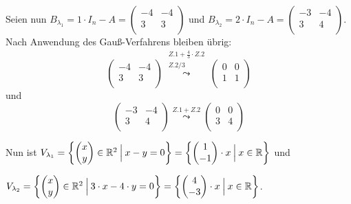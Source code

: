 \documentclass{scrreprt}
\begin{document}
\begin{enumerate}[(a)]
  Seien nun $B_{\lambda_1} = 1 \cdot I_n - A = \begin{pmatrix}
    -4 & -4 \\
    3 & 3 \\
  \end{pmatrix}$ und
  $B_{\lambda_2} = 2 \cdot I_n - A = \begin{pmatrix}
    -3 & -4 \\
    3 & 4 \\
  \end{pmatrix}$.
  Nach Anwendung des Gauß-Verfahrens bleiben übrig:
  \[
    \begin{pmatrix}
      -4 & -4 \\
      3 & 3 \\
    \end{pmatrix}
    \overset{
      \substack{
        Z.1 + \frac{4}{3} \cdot Z.2 \\
        Z.2 / 3
      }
    }\leadsto
    \begin{pmatrix}
      0 & 0 \\
      1 & 1 \\
    \end{pmatrix}
  \]
  und
  \[
    \begin{pmatrix}
      -3 & -4 \\
      3 & 4 \\
    \end{pmatrix}
    \overset{Z.1 + Z.2}
    \leadsto
    \begin{pmatrix}
      0 & 0 \\
      3 & 4 \\
    \end{pmatrix}
  \]

  Nun ist $V_{\lambda_1} = \qty{
    \begin{pmatrix}x\\y\end{pmatrix} \in \mathbb{R}^2
    \:{\Big |}\:
    x - y = 0
  } = \qty{
    \begin{pmatrix}1\\-1\end{pmatrix} \cdot x
    \:{\Big |}\:
    x \in \mathbb{R}
  }$ und

  $V_{\lambda_2} = \qty{
    \begin{pmatrix}x\\y\end{pmatrix} \in \mathbb{R}^2
    \:{\Big |}\:
    3 \cdot x - 4 \cdot y = 0
  } = \qty{
    \begin{pmatrix}4\\-3\end{pmatrix} \cdot x
    \:{\Big |}\:
    x \in \mathbb{R}
  }$.


\end{enumerate}
\end{document}
